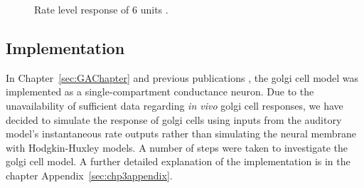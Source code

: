    
\begin{figure}[ht!]
  \centering
  \caption{Rate level response of 6 units
    \citep[from~Fig.~2]{GhoshalKim:1997}. %
  }\label{fig:GolgiKimFig2}
\end{figure}

\subsection{Implementation}

In Chapter~\ref{sec:GAChapter} and previous publications
\citep{EagerGraydenEtAl:2006a}, the golgi cell model was implemented as a
single-compartment conductance neuron. Due to the unavailability of sufficient
data regarding \emph{in vivo} golgi cell responses, we have decided to simulate
the response of golgi cells using inputs from the auditory model's instantaneous
rate outputs rather than simulating the neural membrane with Hodgkin-Huxley
models.  A number of steps were taken to investigate the golgi cell model. A
further detailed explanation of the implementation is in the chapter
Appendix~\ref{sec:chp3appendix}.  \medskip{}

